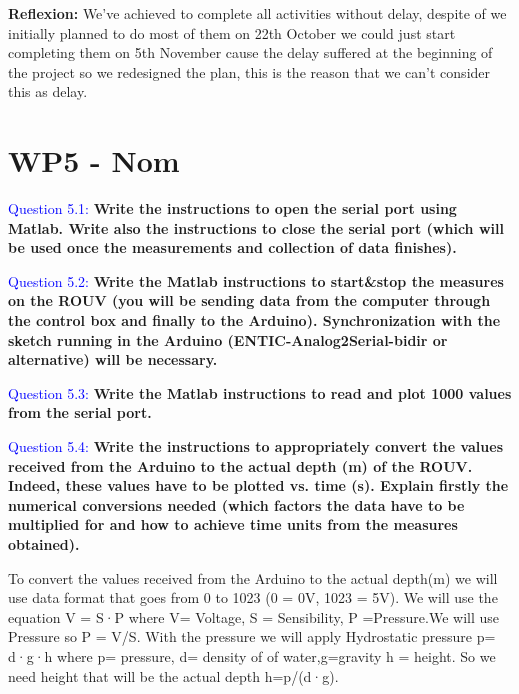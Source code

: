 \documentclass[12pt, a4papre]{article}
\begin{document}
	\textbf{Reflexion: }We’ve achieved to complete all activities without delay, despite of we initially planned to do most of them on 22th October we could just start completing them on 5th November cause the delay suffered at the beginning of the project so we redesigned the plan, this is the reason that we can’t consider this as delay.
	
	\newpage
	
	\section{WP5 - Nom}
	\textcolor{blue}{Question 5.1:} \textbf{Write the instructions to open the serial port using Matlab. Write also the instructions to close the serial port (which will be used once the measurements and collection of data finishes).}
	
	
		 
	\textcolor{blue}{Question 5.2:} \textbf{Write the Matlab instructions to start\&stop the measures on the ROUV (you will be sending data from the computer through the control box and finally to the Arduino). Synchronization with the sketch running in the Arduino (ENTIC-Analog2Serial-bidir or alternative) will be necessary.}
	
	
	
	\textcolor{blue}{Question 5.3:} \textbf{Write the Matlab instructions to read and plot 1000 values from the serial port. }
	
		
		
	\textcolor{blue}{Question 5.4:} \textbf{Write the instructions to appropriately convert the values received from the Arduino to the actual depth (m) of the ROUV. Indeed, these values have to be plotted vs. time (s). Explain firstly the numerical conversions needed (which factors the data have to be multiplied for and how to achieve time units from the measures obtained).}
	
	To convert the values received from the Arduino to the actual depth(m) we will use data format that goes from 0 to 1023 (0 = 0V, 1023 = 5V). We will use the equation V = S·P where V= Voltage, S = Sensibility, P =Pressure.We will use Pressure so P = V/S. With the pressure we will apply Hydrostatic pressure p= d·g·h where p= pressure, d= density of of water,g=gravity  h = height. So we need height that will be the actual depth h=p/(d·g).
	
	
		
\end{document}

